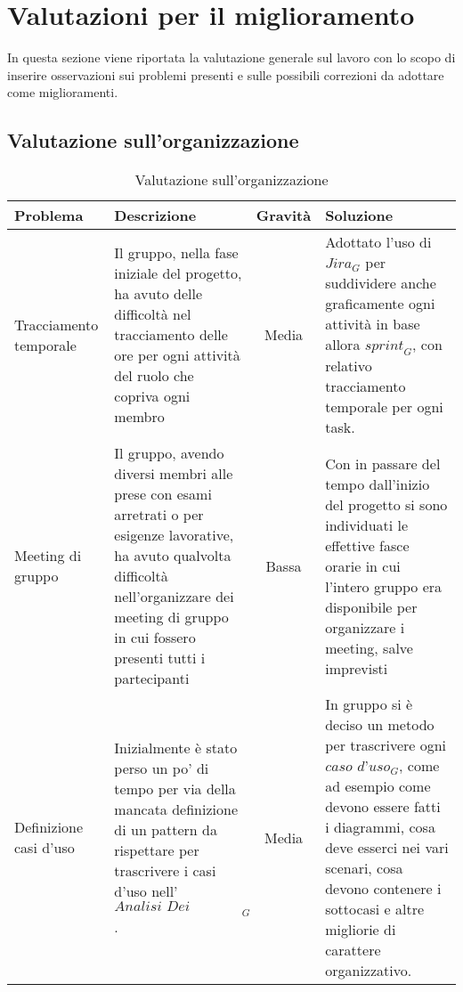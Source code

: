 \section{Valutazioni per il miglioramento}

In questa sezione viene riportata la valutazione generale sul lavoro con lo scopo di inserire osservazioni sui problemi presenti e sulle possibili correzioni da adottare come miglioramenti. 

\subsection{Valutazione sull’organizzazione}

\begin{table}[h]
\centering
\begin{tabular}{|p{3cm}|p{4cm}|c|p{5cm}|}
\hline
\rowcolor{gray!30}
\textbf{Problema} & \textbf{Descrizione} & \textbf{Gravità} & \textbf{Soluzione}\\
\hline
Tracciamento temporale & 
Il gruppo, nella fase iniziale del progetto, ha avuto delle difficoltà nel tracciamento delle ore per ogni attività del ruolo che copriva ogni membro & 
Media & 
Adottato l'uso di $\textit{Jira}_G$ per suddividere anche graficamente ogni attività in base allora $\textit{sprint}_G$, con relativo tracciamento temporale per ogni task. \\
\hline
Meeting di gruppo &
Il gruppo, avendo diversi membri alle prese con esami arretrati o per esigenze lavorative, ha avuto qualvolta difficoltà nell'organizzare dei meeting di gruppo in cui fossero presenti tutti i partecipanti &
Bassa &
Con in passare del tempo dall'inizio del progetto si sono individuati le effettive fasce orarie in cui l'intero gruppo era disponibile per organizzare i meeting, salve imprevisti\\
\hline
Definizione casi d'uso &
Inizialmente è stato perso un po' di tempo per via della mancata definizione di un pattern da rispettare per trascrivere i casi d'uso nell'$\textit{Analisi Dei Requisiti}_G$. &
Media &
In gruppo si è deciso un metodo per trascrivere ogni $\textit{caso d'uso}_G$, come ad esempio come devono essere fatti i diagrammi, cosa deve esserci nei vari scenari, cosa devono contenere i sottocasi e altre migliorie di carattere organizzativo.
\\
\hline
\end{tabular}
\caption{Valutazione sull’organizzazione }
\end{table}
\newpage

